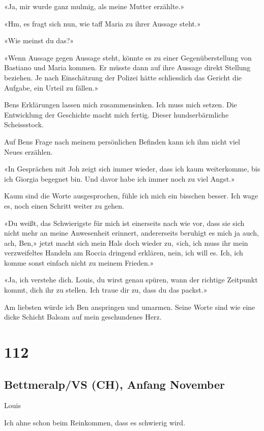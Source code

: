«Ja, mir wurde ganz mulmig, als meine Mutter erzählte.»

«Hm, es fragt sich nun, wie taff Maria zu ihrer Aussage steht.»

«Wie meinst du das?»

«Wenn Aussage gegen Aussage steht, könnte es zu einer Gegenüberstellung
von Bastiano und Maria kommen. Er müsste dann auf ihre Aussage direkt
Stellung beziehen. Je nach Einschätzung der Polizei hätte schliesslich
das Gericht die Aufgabe, ein Urteil zu fällen.»

Bens Erklärungen lassen mich zusammensinken. Ich muss mich setzen. Die
Entwicklung der Geschichte macht mich fertig. Dieser hundserbärmliche
Scheissstock.

Auf Bens Frage nach meinem persönlichen Befinden kann ich ihm nicht viel
Neues erzählen.

«In Gesprächen mit Joh zeigt sich immer wieder, dass ich kaum
weiterkomme, bis ich Giorgia begegnet bin. Und davor habe ich immer noch
zu viel Angst.»

Kaum sind die Worte ausgesprochen, fühle ich mich ein bisschen besser.
Ich wage es, noch einen Schritt weiter zu gehen.

«Du weißt, das Schwierigste für mich ist einerseits nach wie vor, dass
sie sich nicht mehr an meine Anwesenheit erinnert, andererseits beruhigt
es mich ja auch, ach, Ben,» jetzt macht sich mein Hals doch wieder zu,
«ich, ich muss ihr mein verzweifeltes Handeln am Roccia dringend
erklären, nein, ich will es. Ich, ich komme sonst einfach nicht zu
meinem Frieden.»

«Ja, ich verstehe dich. Louis, du wirst genau spüren, wann der richtige
Zeitpunkt kommt, dich ihr zu stellen. Ich traue dir zu, dass du das
packst.»

Am liebsten würde ich Ben anspringen und umarmen. Seine Worte sind wie
eine dicke Schicht Balsam auf mein geschundenes Herz.

\chapter{112}\label{section-112}

\section{Bettmeralp/VS (CH), Anfang
November}\label{bettmeralpvs-ch-anfang-november}

Louis

Ich ahne schon beim Reinkommen, dass es schwierig wird.

